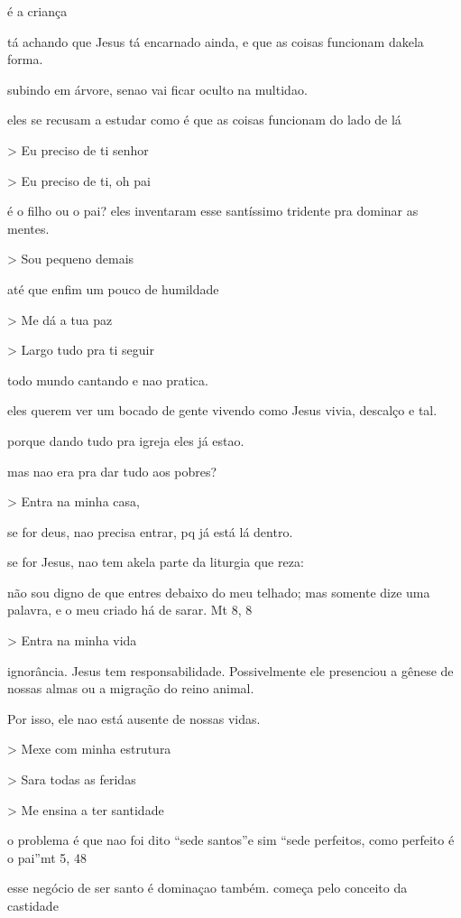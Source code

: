 \documentclass[12pt,a4paper]{article}
\begin{document}
\'e a crian\c{c}a

t\'a achando que Jesus t\'a encarnado ainda, e que as coisas funcionam dakela forma.

subindo em \'arvore, senao vai ficar oculto na multidao.

eles se recusam a estudar como \'e que as coisas funcionam do lado de l\'a

> Eu preciso de ti senhor

> Eu preciso de ti, oh pai

\'e o filho ou o pai? eles inventaram esse sant\'issimo tridente pra dominar as mentes.

> Sou pequeno demais

at\'e que enfim um pouco de humildade

> Me d\'a a tua paz

> Largo tudo pra ti seguir

todo mundo cantando e nao pratica.

eles querem ver um bocado de gente vivendo como Jesus vivia, descal\c{c}o e tal.

porque dando tudo pra igreja eles j\'a estao.

mas nao era pra dar tudo aos pobres?

> Entra na minha casa,

se for deus, nao precisa entrar, pq j\'a est\'a l\'a dentro.

se for Jesus, nao tem akela parte da liturgia que reza:

n\~ao sou digno de que entres debaixo do meu telhado; mas somente dize uma palavra, e o meu criado h\'a de sarar. Mt 8, 8

> Entra na minha vida

ignor\^ancia. Jesus tem responsabilidade. Possivelmente ele presenciou a g\^enese de nossas almas ou a migra\c{c}\~ao do reino animal.

Por isso, ele nao est\'a ausente de nossas vidas.

> Mexe com minha estrutura

> Sara todas as feridas

> Me ensina a ter santidade

o problema \'e que nao foi dito \textquotedblleft sede santos\textquotedblright e sim \textquotedblleft sede perfeitos, como perfeito \'e o pai\textquotedblright mt 5, 48

esse neg\'ocio de ser santo \'e domina\c{c}ao tamb\'em. come\c{c}a pelo conceito da castidade
\end{document}
